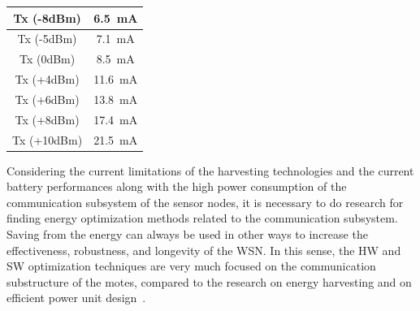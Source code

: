 \documentclass[12pt, oneandhalf, chaparabic, sees, ms]{metu}
\begin{document}
\begin{table}[H]
\begin{center}
\begin{adjustbox}{width=\textwidth}
\begin{tabular}{| c | c |}
Tx (-8dBm)       &   \SI{6.5}{\milli\ampere}      \tabularnewline \hline
Tx (-5dBm)       &   \SI{7.1}{\milli\ampere}      \tabularnewline \hline
Tx (0dBm)        &   \SI{8.5}{\milli\ampere}      \tabularnewline \hline
Tx (+4dBm)       &   \SI{11.6}{\milli\ampere}     \tabularnewline \hline
Tx (+6dBm)       &   \SI{13.8}{\milli\ampere}     \tabularnewline \hline
Tx (+8dBm)       &   \SI{17.4}{\milli\ampere}     \tabularnewline \hline
Tx (+10dBm)      &   \SI{21.5}{\milli\ampere}     \tabularnewline \hline
\end{tabular}
\end{adjustbox}
\end{center}
\end{table}
\renewcommand{\arraystretch}{1}%
% 
%
%
Considering the current limitations of the harvesting technologies and the current battery performances along with the 
high power consumption of the communication subsystem of the sensor nodes, it is necessary to do research for finding energy 
optimization methods related to the communication subsystem. Saving from the energy can always be used in other ways to increase
the effectiveness, robustness, and longevity of the WSN.
In this sense, the HW and SW optimization techniques are very much focused on the communication substructure of the motes, 
compared to the research on energy harvesting and on efficient power unit design~\cite{bomnale2018}.
% 
%
%
% 
%
%

\newpage
\end{document}

